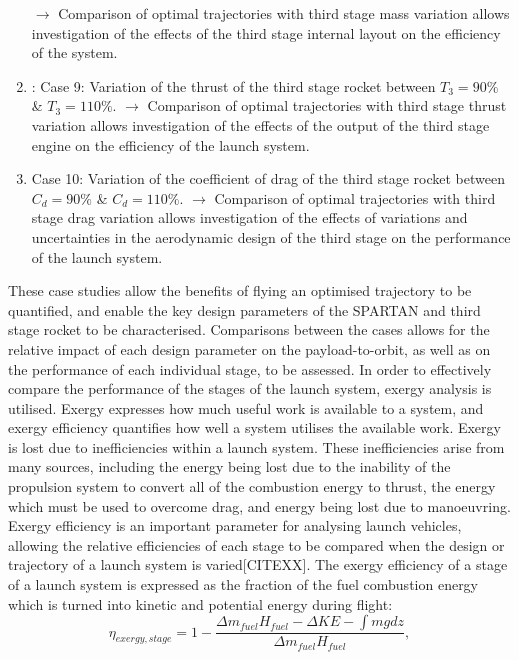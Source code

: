 \begin{enumerate}
	\newline$\rightarrow$ Comparison of optimal trajectories with third stage mass variation allows investigation of the effects of the third stage internal layout on the efficiency of the system. 
	\item: Case 9: Variation of the thrust of the third stage rocket between $T_3 = 90\%$ \& $T_3 = 110\%$. 
	\newline$\rightarrow$ Comparison of optimal trajectories with third stage thrust variation allows investigation of the effects of the output of the third stage engine on the efficiency of the launch system. 
	\item Case 10: Variation of the coefficient of drag of the third stage rocket between $C_d = 90\%$ \& $C_d = 110\%$.
	\newline$\rightarrow$ Comparison of optimal trajectories with third stage drag variation allows investigation of the effects of variations and uncertainties in the aerodynamic design of the third stage on the performance of the launch system.
\end{enumerate}
These case studies allow the benefits of flying an optimised trajectory to be quantified, and enable the key design parameters of the SPARTAN and third stage rocket to be characterised. Comparisons between the cases allows for the relative impact of each design parameter on the payload-to-orbit, as well as on the performance of each individual stage, to be assessed. 
In order to effectively compare the performance of the stages of the launch system, exergy analysis is utilised. Exergy expresses how much useful work is available to a system, and exergy efficiency quantifies how well a system utilises the available work. Exergy is lost due to inefficiencies within a launch system. These inefficiencies arise from many sources, including the energy being lost due to the inability of the propulsion system to convert all of the combustion energy to thrust, the energy which must be used to overcome drag, and energy being lost due to manoeuvring. Exergy efficiency is an important parameter for analysing launch vehicles, allowing the relative efficiencies of each stage to be compared when the design or trajectory of a launch system is varied[CITEXX]. The exergy efficiency of a stage of a launch system is expressed as the fraction of the fuel combustion energy which is turned into kinetic and potential energy during flight:
\begin{equation}
\eta_{exergy,stage} = 1 - \frac{\Delta m_{fuel}H_{fuel} - \Delta KE - \int mg dz}{\Delta m_{fuel}H_{fuel}},
\end{equation}

